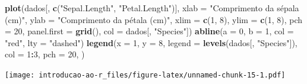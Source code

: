 \documentclass[
]{book}
\newenvironment{Shaded}{\begin{snugshade}}{\end{snugshade}}
\newcommand{\DataTypeTok}[1]{\textcolor[rgb]{0.13,0.29,0.53}{#1}}
\newcommand{\DecValTok}[1]{\textcolor[rgb]{0.00,0.00,0.81}{#1}}
\newcommand{\KeywordTok}[1]{\textcolor[rgb]{0.13,0.29,0.53}{\textbf{#1}}}
\newcommand{\NormalTok}[1]{#1}
\newcommand{\OperatorTok}[1]{\textcolor[rgb]{0.81,0.36,0.00}{\textbf{#1}}}
\newcommand{\StringTok}[1]{\textcolor[rgb]{0.31,0.60,0.02}{#1}}
\begin{document}
\begin{Shaded}
\begin{Highlighting}[]
\KeywordTok{plot}\NormalTok{(dados[, }\KeywordTok{c}\NormalTok{(}\StringTok{"Sepal.Length"}\NormalTok{, }\StringTok{"Petal.Length"}\NormalTok{)],}
     \DataTypeTok{xlab =} \StringTok{"Comprimento da sépala (cm)"}\NormalTok{,}
     \DataTypeTok{ylab =} \StringTok{"Comprimento da pétala (cm)"}\NormalTok{,}
     \DataTypeTok{xlim =} \KeywordTok{c}\NormalTok{(}\DecValTok{1}\NormalTok{, }\DecValTok{8}\NormalTok{), }\DataTypeTok{ylim =} \KeywordTok{c}\NormalTok{(}\DecValTok{1}\NormalTok{, }\DecValTok{8}\NormalTok{), }\DataTypeTok{pch =} \DecValTok{20}\NormalTok{,}
     \DataTypeTok{panel.first =} \KeywordTok{grid}\NormalTok{(), }\DataTypeTok{col =}\NormalTok{ dados[, }\StringTok{"Species"}\NormalTok{])}
\KeywordTok{abline}\NormalTok{(}\DataTypeTok{a =} \DecValTok{0}\NormalTok{, }\DataTypeTok{b =} \DecValTok{1}\NormalTok{, }\DataTypeTok{col =} \StringTok{"red"}\NormalTok{, }\DataTypeTok{lty =} \StringTok{"dashed"}\NormalTok{)}
\KeywordTok{legend}\NormalTok{(}\DataTypeTok{x =} \DecValTok{1}\NormalTok{, }\DataTypeTok{y =} \DecValTok{8}\NormalTok{, }\DataTypeTok{legend =} \KeywordTok{levels}\NormalTok{(dados[, }\StringTok{"Species"}\NormalTok{]), }
       \DataTypeTok{col =} \DecValTok{1}\OperatorTok{:}\DecValTok{3}\NormalTok{, }\DataTypeTok{pch =} \DecValTok{20}\NormalTok{, )}
\end{Highlighting}
\end{Shaded}

\texttt{[image: introducao-ao-r\_files/figure-latex/unnamed-chunk-15-1.pdf]}

  
\end{document}
